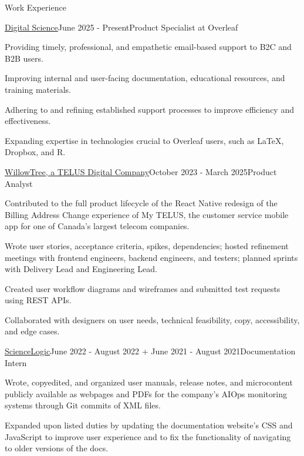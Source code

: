 \documentclass[11pt]{resume} %
\begin{document}
\begin{rSection}{Work Experience}

	\begin{rSubsection}{\href{https://www.digital-science.com/}{Digital Science}}{June 2025 - Present}{Product Specialist at Overleaf}{}\small
		\item Providing timely, professional, and empathetic email-based support to B2C and B2B users.
		\item Improving internal and user-facing documentation, educational resources, and training materials.
		\item Adhering to and refining established support processes to improve efficiency and effectiveness.
		\item Expanding expertise in technologies crucial to Overleaf users, such as \LaTeX, Dropbox, and R.
	\end{rSubsection}


	\begin{rSubsection}{\href{https://www.willowtreeapps.com/}{WillowTree, a TELUS Digital Company}}{October 2023 - March 2025}{Product Analyst}{}\small
		\item Contributed to the full product lifecycle of the React Native redesign of the Billing Address Change experience of My TELUS, the customer service mobile app for one of Canada’s largest telecom companies.
		\item Wrote user stories, acceptance criteria, spikes, dependencies; hosted refinement meetings with frontend engineers, backend engineers, and testers; planned sprints with Delivery Lead and Engineering Lead.
		\item Created user workflow diagrams and wireframes and submitted test requests using REST APIs.
            \item Collaborated with designers on user needs, technical feasibility, copy, accessibility, and edge cases.
	\end{rSubsection}


	\begin{rSubsection}{\href{https://sciencelogic.com/}{ScienceLogic}}{June 2022 - August 2022 + June 2021 - August 2021}{Documentation Intern}{}\small
		\item Wrote, copyedited, and organized user manuals, release notes, and microcontent publicly available as webpages and PDFs for the company's AIOps monitoring systems through Git commits of XML files.
		\item Expanded upon listed duties by updating the documentation website’s CSS and JavaScript to improve user experience and to fix the functionality of navigating to older versions of the docs.
	\end{rSubsection}


\end{rSection}
\end{document}
